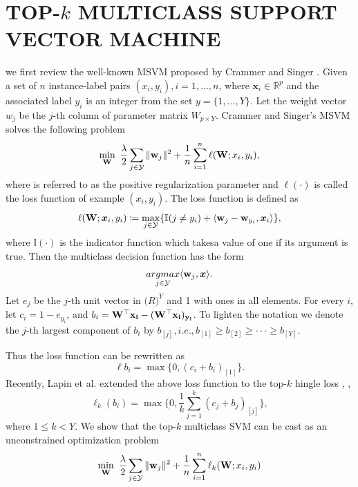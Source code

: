 \documentclass[journal]{IEEEtran}
\begin{document}
\section{TOP-$k$ MULTICLASS SUPPORT VECTOR MACHINE}
we first review the well-known MSVM proposed by Crammer and Singer \cite{Crammer2001algorithmic}. Given a set of $n$ instance-label pairs $(x_i, y_i), i = 1, ..., n$, where $\bm{x}_i \in \mathbb{R}^{p}$ and the associated label $y_i$ is an integer from the set $y = \{1, ..., Y\}$. Let the weight vector $w_j$ be the $j$-th column of parameter matrix $W_{p \times Y}$. Crammer and Singer's MSVM solves the following problem
\begin{equation}
	\min\limits_{{\bf{W}}}~\frac{\lambda}{2}\sum\limits_{j\in\mathcal{Y}}\Vert{\bf{w}}_j\Vert^2+\frac{1}{n}\sum\limits_{i=1}^n\ell({\bf{W}};x_i, y_i),
\end{equation}
where is referred to as the positive regularization parameter and $\ell(\cdot)$ is called the loss function of example $(x_i, y_i)$. The loss function is defined as
\begin{equation*}
	\ell({\bf{W}};\bm{x}_i,y_i)\coloneqq \max\limits_{j\in\mathcal{Y}}\{\mathbb{I}(j\ne y_i)+\langle{\bf{w}}_j-{\bf{w}}_{y_i},\bm{x}_i\rangle\},
\end{equation*}
where $\mathbb{I}(\cdot)$ is the indicator function which takesa value of one if its argument is true. Then the multiclass decision function has the form
\begin{equation*}
	\mathop{argmax}\limits_{j\in\mathcal{Y}}\langle{\bf{w}}_j, \bm{x}\rangle.
\end{equation*}
Let $e_j$ be the $j$-th unit vector in $\mathbb(R)^Y$ and 1 with ones in all elements. For every $i$, let $c_i = 1 - e_{y_i}$, and $b_i = \bf{W}^{\top{}}x_i - (\bf{W}^{\top{}}x_i)_{y_i}$. To lighten the notation we denote the $j$-th largest component of $b_i$ by $b_{[j]},i.e.,b_{[1]} \ge b_{[2]} \ge \cdot \cdot \cdot \ge b_{[Y]}$.

Thus the loss function can be rewritten as
\begin{equation*}
	\ell{b_i} = \max\{0, (c_i + b_i)_{[1]}\}.
\end{equation*} 
Recently, Lapin et al. extended the above loss function to the top-$k$ hingle loss \cite{Lapin2015Top}, \cite{Lapin2016Loss},
\begin{equation}
	\ell_k(b_i) = \max\{0,\frac{1}{k}\sum_{j=1}^k(c_j+b_j)_{[j]}\},
\end{equation}
where $1 \leq k < Y$. We show that the top-$k$ multiclass SVM can be cast as an unconstrained optimization problem
\begin{equation}
	\min\limits_{{\bf{W}}}~\frac{\lambda}{2}\sum\limits_{j\in\mathcal{Y}}\Vert{\bf{w}}_j\Vert^2+\frac{1}{n}\sum\limits_{i=1}^n\ell_k({\bf{W}};x_i, y_i)
\end{equation}
\end{document}
